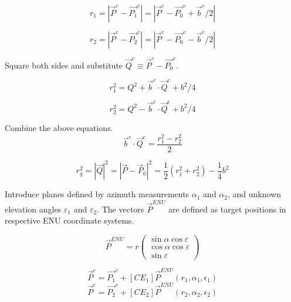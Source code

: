 \documentclass[12pt]{article}
\begin{document}
	\begin{equation}
		r_1 = |\vec{P}^c - \vec{P_1}^c| = |\vec{P}^c - \vec{P_0}^c + \vec{b}^c/2|
	\end{equation}
	
	\begin{equation}
		r_2 = |\vec{P}^c - \vec{P_2}^c| = |\vec{P}^c - \vec{P_0}^c - \vec{b}^c/2|
	\end{equation}

	Square both sides and substitute $\vec{Q}^c \equiv \vec{P}^c - \vec{P_0}^c$.
	
	\begin{equation}
		r_1^2 = Q^2 + \vec{b}^c \cdot \vec{Q}^c + b^2/4
	\end{equation}

	\begin{equation}
		r_2^2 = Q^2 - \vec{b}^c \cdot \vec{Q}^c + b^2/4
	\end{equation}
	
	Combine the above equations.
	\begin{equation}
		\vec{b}^c \cdot \vec{Q}^c=\frac{r_1^2-r_2^2}{2}
	\end{equation}
	
	\begin{equation}
		r_q^2=|\vec{Q}|^2=\left|\vec{P}-\vec{P}_0\right|^2=\frac{1}{2}\left(r_1^2+r_2^2\right)-\frac{1}{4} b^2
	\end{equation}	
	
	Introduce planes defined by azimuth measurements $\alpha_1$  and $\alpha_2$, and unknown elevation angles
	$\varepsilon_1$  and $\varepsilon_2$. The vectors $\vec{P}^{ENU}$ are defined as target positions in respective ENU
	coordinate systems.
	
	\begin{equation}
		\vec{P}^{ENU} = r\left(\begin{array}{c}
			\sin\alpha \cos\varepsilon \\
			\cos\alpha \cos\varepsilon \\
			\sin\varepsilon
			\end{array}\right)
			\label{eq:pos_vec_enu}
	\end{equation}	
	
	\begin{equation}
		\vec{P}^c = \vec{P_1}^c + [CE_1] \vec{P}^{ENU}(r_1,\alpha_1,\epsilon_1)
	\end{equation}	
	\begin{equation}
		\vec{P}^c = \vec{P_2}^c + [CE_2] \vec{P}^{ENU}(r_2,\alpha_2,\epsilon_2)
	\end{equation}
\end{document}

